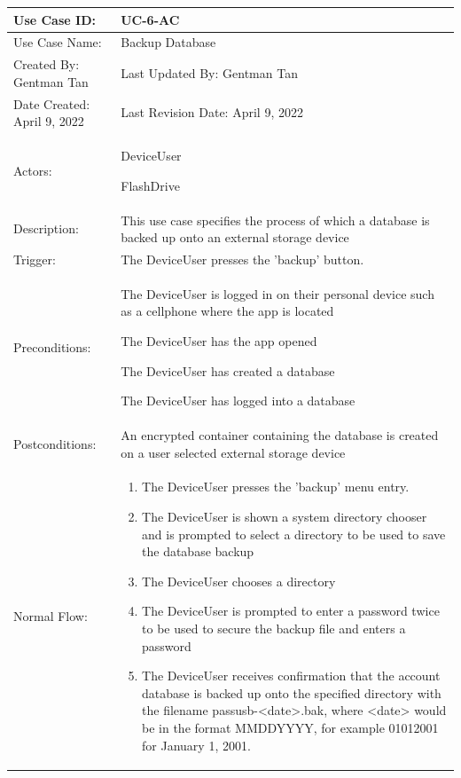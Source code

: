 \documentclass[stu]{apa7}
\newcommand{\nextitem}{\par\hspace*{\labelsep}\textbullet\hspace*{\labelsep}}
\begin{document}
\scriptsize{\begin{xltabular}{\textwidth}{|l|X|}
  \hline Use Case ID: & UC-6-AC \\ \hline

  Use Case Name: & Backup Database \\ \hline

  Created By: Gentman Tan & Last Updated By: Gentman Tan\\ \hline

  Date Created: April 9, 2022 & Last Revision Date: April 9, 2022 \\ \hline

  Actors: & \nextitem DeviceUser \nextitem FlashDrive  \\ \hline

  Description: & This use case specifies the process of which a database is backed up onto an external storage device \\ \hline

  Trigger: & The DeviceUser presses the 'backup' button. \\ \hline

  Preconditions: & \nextitem The DeviceUser is logged in on their personal device such as a cellphone where the app is located \nextitem The DeviceUser has the app opened \nextitem The DeviceUser has created a database \nextitem The DeviceUser has logged into a database \\ \hline

  Postconditions: & \nextitem An encrypted container containing the database is created on a user selected external storage device  \\ \hline

  Normal Flow: &
    \begin{enumerate}
      \item The DeviceUser presses the 'backup' menu entry.
      \item The DeviceUser is shown a system directory chooser and is prompted to select a directory to be used to save the database backup
      \item The DeviceUser chooses a directory
      \item The DeviceUser is prompted to enter a password twice to be used to secure the backup file and enters a password
      \item The DeviceUser receives confirmation that the account database is backed up onto the specified directory with the filename passusb-<date>.bak, where <date> would be in the format MMDDYYYY, for example 01012001 for January 1, 2001.
    \end{enumerate} \\ \hline


\end{xltabular}}
\end{document}
